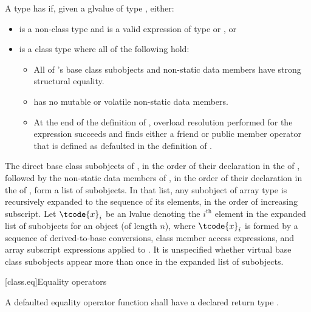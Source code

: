 \pnum
{}%
A type  has  if,
given a glvalue  of type , either:
\begin{itemize}
\item
{} is a non-class type and
 is a valid expression
of type  or , or

\item
{} is a class type
where all of the following hold:
\begin{itemize}
\item All of 's base class subobjects and non-static data members
have strong structural equality.
\item {} has no mutable or volatile non-static data members.
\item At the end of the definition of ,
overload resolution performed for the expression  succeeds and
finds either a friend or public member \tcode{==} operator
that is defined as defaulted in the definition of .
\end{itemize}
\end{itemize}

\pnum
The direct base class subobjects of ,
in the order of their declaration in the  of ,
followed by the non-static data members of ,
in the order of their declaration in the  of ,
form a list of subobjects.
In that list, any subobject of array type is recursively expanded
to the sequence of its elements, in the order of increasing subscript.
Let $\tcode{x}_i$ be an lvalue denoting the $i^\text{th}$ element
in the expanded list of subobjects for an object 
(of length $n$),
where $\tcode{x}_i$ is
formed by a sequence of
derived-to-base conversions,
class member access expressions, and
array subscript expressions applied to .
It is unspecified whether virtual base class subobjects
appear more than once in the expanded list of subobjects.

[class.eq]{Equality operators}
%
%

\pnum
A defaulted equality operator function
shall have a declared return type .

